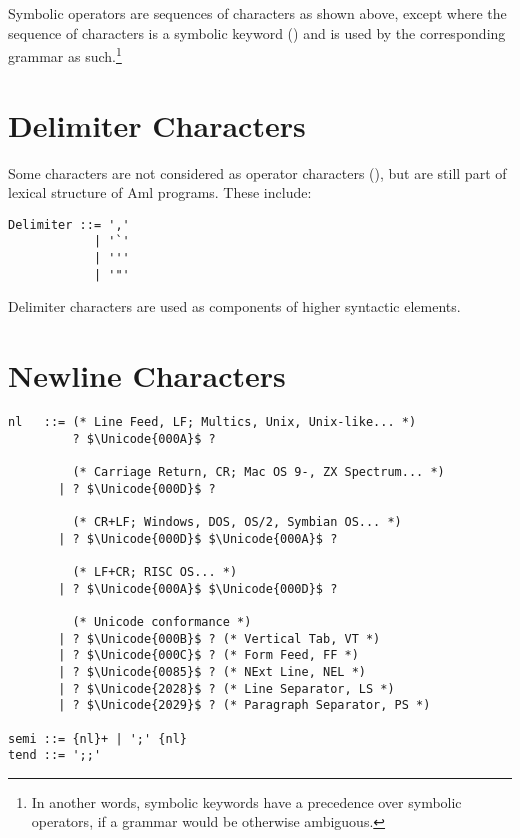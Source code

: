 Symbolic operators are sequences of characters as shown above, except where the sequence of characters is a symbolic keyword () and is used by the corresponding grammar as such.\footnote{In another words, symbolic keywords have a precedence over symbolic operators, if a grammar would be otherwise ambiguous.}





\section{Delimiter Characters}
\label{sec:delimiter-characters}

Some characters are not considered as operator characters (), but are still part of lexical structure of Aml programs. These include:

\syntax\begin{lstlisting}[deletekeywords={of}]
Delimiter ::= ','
            | '`'  
            | ''' 
            | '"'
\end{lstlisting}

Delimiter characters are used as components of higher syntactic elements. 





\section{Newline Characters}
\label{sec:newlinecharacters}

\syntax\begin{lstlisting}
nl   ::= (* Line Feed, LF; Multics, Unix, Unix-like... *)
         ? $\Unicode{000A}$ ? 
         
         (* Carriage Return, CR; Mac OS 9-, ZX Spectrum... *)
       | ? $\Unicode{000D}$ ? 
       
         (* CR+LF; Windows, DOS, OS/2, Symbian OS... *)
       | ? $\Unicode{000D}$ $\Unicode{000A}$ ?
       
         (* LF+CR; RISC OS... *)
       | ? $\Unicode{000A}$ $\Unicode{000D}$ ?
       
         (* Unicode conformance *)
       | ? $\Unicode{000B}$ ? (* Vertical Tab, VT *)
       | ? $\Unicode{000C}$ ? (* Form Feed, FF *)
       | ? $\Unicode{0085}$ ? (* NExt Line, NEL *)
       | ? $\Unicode{2028}$ ? (* Line Separator, LS *)
       | ? $\Unicode{2029}$ ? (* Paragraph Separator, PS *)
       
semi ::= {nl}+ | ';' {nl}
tend ::= ';;'
\end{lstlisting}

